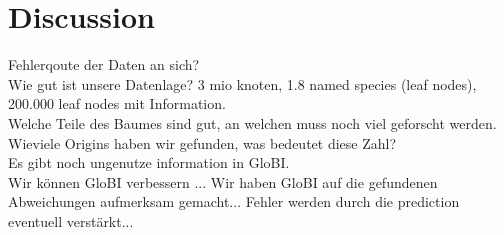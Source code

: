 \chapter{Discussion}

  Fehlerqoute der Daten an sich? \\
  Wie gut ist unsere Datenlage? 3 mio knoten, 1.8 named species (leaf nodes), 200.000 leaf nodes mit 
  Information. \\
  Welche Teile des Baumes sind gut, an welchen muss noch viel geforscht werden. \\
  Wieviele Origins haben wir gefunden, was bedeutet diese Zahl? \\
  Es gibt noch ungenutze information in GloBI. \\
  Wir können GloBI verbessern ... Wir haben GloBI auf die gefundenen Abweichungen aufmerksam gemacht... 
    Fehler werden durch die prediction eventuell verstärkt...\\

